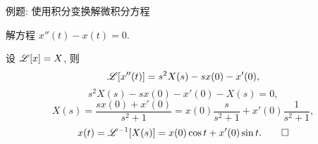 \begin{frame}{例题: 使用积分变换解微积分方程}
\begin{example}
解方程 $x''(t)-x(t)=0$.
\end{example}
\begin{solution}
设 $\mathscr{L}[x]=X$, 则
\[\mathscr{L}[x''(t)]=s^2X(s)-sx(0)-x'(0),\]
\onslide<+->
\vspace{-\baselineskip}
\[s^2X(s)-sx(0)-x'(0)-X(s)=0,\]
\onslide<+->
\vspace{-0.8\baselineskip}
\[X(s)=\frac{sx(0)+x'(0)}{s^2+1}=x(0)\frac s{s^2+1}+x'(0)\frac1{s^2+1},\]
\onslide<+->
\vspace{-0.8\baselineskip}
\[x(t)=\mathscr{L}^{-1}[X(s)]=x(0)\cos t+x'(0)\sin t.\qedhere\]
\end{solution}
\end{frame}
